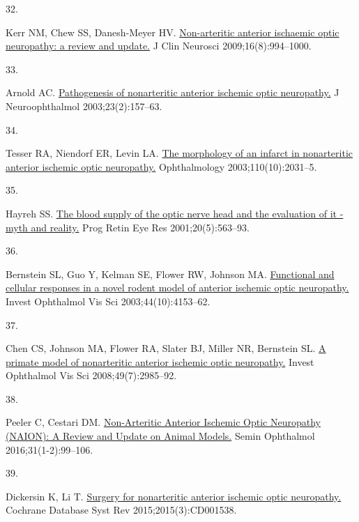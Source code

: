 \documentclass[
  11pt,
]{article}
\newlength{\cslhangindent}
\newlength{\csllabelwidth}
\newenvironment{CSLReferences}[2] %
 {\begin{list}{}{%
  \setlength{\itemindent}{0pt}
  \setlength{\leftmargin}{0pt}
  \setlength{\parsep}{0pt}
  \ifodd #1
   \setlength{\leftmargin}{\cslhangindent}
   \setlength{\itemindent}{-1\cslhangindent}
  \fi
  \setlength{\itemsep}{#2\baselineskip}}}
 {\end{list}}
\newcommand{\CSLLeftMargin}[1]{\parbox[t]{\csllabelwidth}{\strut#1\strut}}
\newcommand{\CSLRightInline}[1]{\parbox[t]{\linewidth - \csllabelwidth}{\strut#1\strut}}
\begin{document}
\begin{CSLReferences}{0}{1}
\CSLLeftMargin{32. }%
\CSLRightInline{Kerr NM, Chew SS, Danesh-Meyer HV.
\href{https://doi.org/10.1016/j.jocn.2009.04.002}{{Non-arteritic
anterior ischaemic optic neuropathy: a review and update.}} J Clin
Neurosci 2009;16(8):994--1000. }

\CSLLeftMargin{33. }%
\CSLRightInline{Arnold AC.
\href{https://doi.org/10.1097/00041327-200306000-00012}{{Pathogenesis of
nonarteritic anterior ischemic optic neuropathy.}} J Neuroophthalmol
2003;23(2):157--63. }

\CSLLeftMargin{34. }%
\CSLRightInline{Tesser RA, Niendorf ER, Levin LA.
\href{https://doi.org/10.1016/S0161-6420(03)00804-2}{{The morphology of
an infarct in nonarteritic anterior ischemic optic neuropathy.}}
Ophthalmology 2003;110(10):2031--5. }

\CSLLeftMargin{35. }%
\CSLRightInline{Hayreh SS.
\href{https://doi.org/10.1016/s1350-9462(01)00004-0}{{The blood supply
of the optic nerve head and the evaluation of it - myth and reality.}}
Prog Retin Eye Res 2001;20(5):563--93. }

\CSLLeftMargin{36. }%
\CSLRightInline{Bernstein SL, Guo Y, Kelman SE, Flower RW, Johnson MA.
\href{https://doi.org/10.1167/iovs.03-0274}{{Functional and cellular
responses in a novel rodent model of anterior ischemic optic
neuropathy.}} Invest Ophthalmol Vis Sci 2003;44(10):4153--62. }

\CSLLeftMargin{37. }%
\CSLRightInline{Chen CS, Johnson MA, Flower RA, Slater BJ, Miller NR,
Bernstein SL. \href{https://doi.org/10.1167/iovs.07-1651}{{A primate
model of nonarteritic anterior ischemic optic neuropathy.}} Invest
Ophthalmol Vis Sci 2008;49(7):2985--92. }

\CSLLeftMargin{38. }%
\CSLRightInline{Peeler C, Cestari DM.
\href{https://doi.org/10.3109/08820538.2015.1115248}{{Non-Arteritic
Anterior Ischemic Optic Neuropathy (NAION): A Review and Update on
Animal Models.}} Semin Ophthalmol 2016;31(1-2):99--106. }

\CSLLeftMargin{39. }%
\CSLRightInline{Dickersin K, Li T.
\href{https://doi.org/10.1002/14651858.CD001538.pub4}{{Surgery for
nonarteritic anterior ischemic optic neuropathy.}} Cochrane Database
Syst Rev 2015;2015(3):CD001538. }


\end{CSLReferences}
\end{document}
